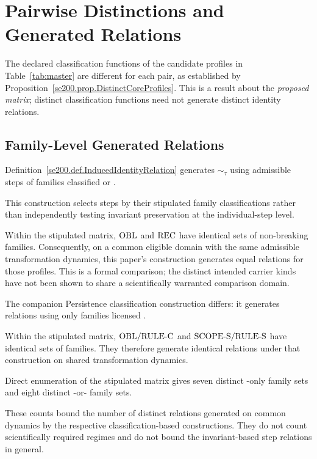 
\section{Pairwise Distinctions and Generated Relations}
\label{app:sep}

The declared classification functions of the candidate profiles in
Table~\ref{tab:master} are different for each pair, as established by
Proposition~\ref{se200.prop.DistinctCoreProfiles}.
This is a result about the \emph{proposed matrix}; distinct
classification functions need not generate distinct identity
relations.

\subsection{Family-Level Generated Relations}

Definition~\ref{se200.def.InducedIdentityRelation} generates
$\sim_\tau$ using admissible steps of families classified
\PRS{} or \NEU{}.

This construction selects steps by their stipulated family
classifications rather than independently testing invariant
preservation at the individual-step level.

Within the stipulated matrix, $\mathrm{OBL}$ and $\mathrm{REC}$ have identical
sets of non-breaking families.
Consequently, on a common eligible domain with the same
admissible transformation dynamics, this paper's construction
generates equal relations for those profiles.
This is a formal comparison; the distinct intended carrier
kinds have not been shown to share a scientifically warranted
comparison domain.

The companion Persistence classification construction differs:
it generates relations using only families licensed \PRS{}.

Within the stipulated matrix, $\mathrm{OBL}/\mathrm{RULE\text{-}C}$ and
$\mathrm{SCOPE\text{-}S}/\mathrm{RULE\text{-}S}$ have identical sets of \PRS{} families.
They therefore generate identical relations under that
construction on shared transformation dynamics.

Direct enumeration of the stipulated matrix gives seven
distinct \PRS{}-only family sets and eight distinct
\PRS{}-or-\NEU{} family sets.

These counts bound the number of distinct relations generated
on common dynamics by the respective classification-based
constructions.
They do not count scientifically required regimes and do not
bound the invariant-based step relations in general.

